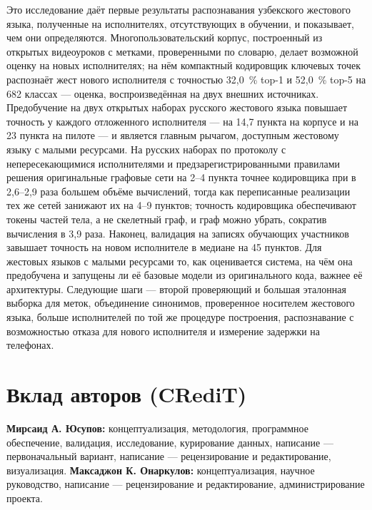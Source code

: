 \documentclass[a4paper,fleqn]{cas-dc}
\begin{document}
Это исследование даёт первые результаты распознавания узбекского жестового языка, полученные на исполнителях, отсутствующих в обучении, и показывает, чем они определяются. Многопользовательский корпус, построенный из открытых видеоуроков с метками, проверенными по словарю, делает возможной оценку на новых исполнителях; на нём компактный кодировщик ключевых точек распознаёт жест нового исполнителя с точностью 32,0~\% top-1 и 52,0~\% top-5 на 682 классах --- оценка, воспроизведённая на двух внешних источниках. Предобучение на двух открытых наборах русского жестового языка повышает точность у каждого отложенного исполнителя --- на 14,7 пункта на корпусе и на 23 пункта на пилоте --- и является главным рычагом, доступным жестовому языку с малыми ресурсами. На русских наборах по протоколу с непересекающимися исполнителями и предзарегистрированными правилами решения оригинальные графовые сети на 2--4 пункта точнее кодировщика при в 2,6--2,9 раза большем объёме вычислений, тогда как переписанные реализации тех же сетей занижают их на 4--9 пунктов; точность кодировщика обеспечивают токены частей тела, а не скелетный граф, и граф можно убрать, сократив вычисления в 3,9 раза. Наконец, валидация на записях обучающих участников завышает точность на новом исполнителе в медиане на 45 пунктов. Для жестовых языков с малыми ресурсами то, как оценивается система, на чём она предобучена и запущены ли её базовые модели из оригинального кода, важнее её архитектуры. Следующие шаги --- второй проверяющий и большая эталонная выборка для меток, объединение синонимов, проверенное носителем жестового языка, больше исполнителей по той же процедуре построения, распознавание с возможностью отказа для нового исполнителя и измерение задержки на телефонах.

\hypertarget{ux432ux43aux43bux430ux434-ux430ux432ux442ux43eux440ux43eux432-credit}{%
\section*{Вклад авторов (CRediT)}\label{ux432ux43aux43bux430ux434-ux430ux432ux442ux43eux440ux43eux432-credit}}

\textbf{Мирсаид А. Юсупов:} концептуализация, методология, программное обеспечение, валидация, исследование, курирование данных, написание --- первоначальный вариант, написание --- рецензирование и редактирование, визуализация. \textbf{Максаджон К. Онаркулов:} концептуализация, научное руководство, написание --- рецензирование и редактирование, администрирование проекта.
\end{document}
